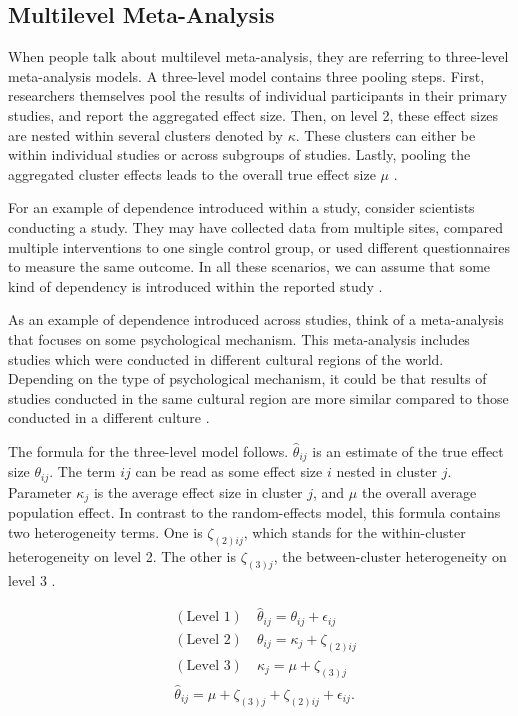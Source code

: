 \documentclass[../../../main.tex]{subfiles}
\begin{document}
\subsection{Multilevel Meta-Analysis}

When people talk about multilevel meta-analysis, they are referring to three-level meta-analysis models. A three-level model contains three pooling steps. First, researchers themselves pool the results of individual participants in their primary studies, and report the aggregated effect size. Then, on level 2, these effect sizes are nested within several clusters denoted by $\kappa$. These clusters can either be within individual studies or across subgroups of studies. Lastly, pooling the aggregated cluster effects leads to the overall true effect size $\mu$ \autocite{Harrer2021}.

For an example of dependence introduced within a study, consider scientists conducting a study. They may have collected data from multiple sites, compared multiple interventions to one single control group, or used different questionnaires to measure the same outcome. In all these scenarios, we can assume that some kind of dependency is introduced within the reported study \autocite{Harrer2021}.

As an example of dependence introduced across studies, think of a meta-analysis that focuses on some psychological mechanism. This meta-analysis includes studies which were conducted in different cultural regions of the world. Depending on the type of psychological mechanism, it could be that results of studies conducted in the same cultural region are more similar compared to those conducted in a different culture \autocite{Harrer2021}.

The formula for the three-level model follows. $\hat{\theta}_{ij}$ is an estimate of the true effect size $\theta_{ij}$. The term $ij$ can be read as some effect size $i$ nested in cluster $j$. Parameter $\kappa_j$ is the average effect size in cluster $j$, and $\mu$ the overall average population effect. In contrast to the random-effects model, this formula contains two heterogeneity terms. One is $\zeta_{(2)ij}$, which stands for the within-cluster heterogeneity on level 2. The other is $\zeta_{(3)j}$, the between-cluster heterogeneity on level 3 \autocite{Harrer2021}.

\begin{align}
&(\text{Level 1}) \quad \hat{\theta}_{ij} = \theta_{ij} + \epsilon_{ij} \\
&(\text{Level 2}) \quad \theta_{ij} = \kappa_j + \zeta_{(2)ij} \\
&(\text{Level 3}) \quad \kappa_j = \mu + \zeta_{(3)j} \\
&\hat{\theta}_{ij} = \mu + \zeta_{(3)j} + \zeta_{(2)ij} + \epsilon_{ij}. \label{Equation:Multilevel}
\end{align}
\end{document}
